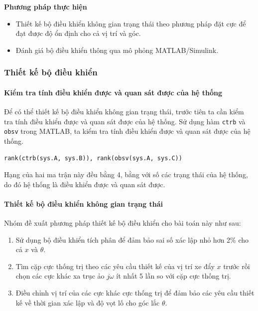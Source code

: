 \documentclass[12pt,a4paper]{article}
\begin{document}
\vspace{\baselineskip}

\begin{minipage}[t]{0.3\linewidth}
    \textbf{Phương pháp thực hiện}
\end{minipage}\begin{minipage}[t]{0.6\linewidth}
    \begin{itemize}[noitemsep,topsep=0pt]
        \item Thiết kế bộ điều khiển không gian trạng thái theo phương pháp đặt cực để đạt được độ ổn định cho cả vị trí và góc. 
        \item Đánh giá bộ điều khiển thông qua mô phỏng MATLAB/Simulink. 
    \end{itemize}
\end{minipage}


\subsubsection{Thiết kế bộ điều khiển}

\paragraph{Kiểm tra tính điều khiển được và quan sát được của hệ thống}\mbox{}

Để có thể thiết kế bộ điều khiển không gian trạng thái, trước tiên ta cần kiểm tra tính điều khiển được và quan sát được của hệ thống. Sử dụng hàm \texttt{ctrb} và \texttt{obsv} trong MATLAB, ta kiểm tra tính điều khiển được và quan sát được của hệ thống.
\begin{lstlisting}[style=matlabstyle,caption=Kiểm tra tính điều khiển được và quan sát được của hệ thống]
rank(ctrb(sys.A, sys.B)), rank(obsv(sys.A, sys.C))
\end{lstlisting}

Hạng của hai ma trận này đều bằng 4, bằng với số các trạng thái của hệ thống, do đó hệ thống là điều khiển được và quan sát được.

\paragraph{Thiết kế bộ điều khiển không gian trạng thái}\mbox{}

Nhóm đề xuất phương pháp thiết kế bộ điều khiển cho bài toán này như sau:
\begin{enumerate}
    \item Sử dụng bộ điều khiển tích phân để đảm bảo sai số xác lập nhỏ hơn 2\% cho cả $x$ và $\theta$.
    \item Tìm cặp cực thống trị theo các yêu cầu thiết kế của vị trí xe đẩy $x$ trước rồi chọn các cực khác xa trục ảo $j\omega$ ít nhất 5 lần so với cặp cực thống trị.
    \item Điều chỉnh vị trí của các cực khác cực thống trị để đảm bảo các yêu cầu thiết kế về thời gian xác lập và độ vọt lố cho góc lắc $\theta$.
\end{enumerate} 
\end{document}

